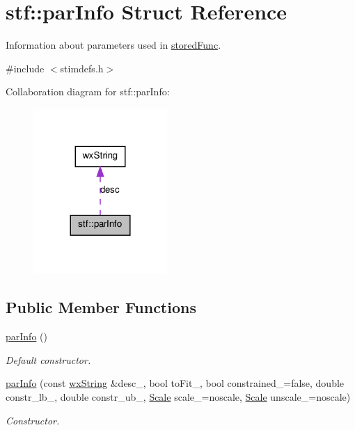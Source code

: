 \hypertarget{structstf_1_1parInfo}{
\section{stf::parInfo Struct Reference}
\label{structstf_1_1parInfo}
}


Information about parameters used in \hyperlink{structstf_1_1storedFunc}{storedFunc}.  




{\ttfamily \#include $<$stimdefs.h$>$}



Collaboration diagram for stf::parInfo:
\nopagebreak
\begin{figure}[H]
\begin{center}
\leavevmode
\includegraphics[width=144pt]{structstf_1_1parInfo__coll__graph}
\end{center}
\end{figure}
\subsection*{Public Member Functions}
\begin{DoxyCompactItemize}
\item 
\hypertarget{structstf_1_1parInfo_a785b7e816901e1a9d9a1d1081028e74d}{
\hyperlink{structstf_1_1parInfo_a785b7e816901e1a9d9a1d1081028e74d}{parInfo} ()}
\label{structstf_1_1parInfo_a785b7e816901e1a9d9a1d1081028e74d}

\begin{DoxyCompactList}\small\item\em Default constructor. \item\end{DoxyCompactList}\item 
\hyperlink{structstf_1_1parInfo_ac5abdf716cbc842663539219eafb2ca4}{parInfo} (const \hyperlink{classwxString}{wxString} \&desc\_\-, bool toFit\_\-, bool constrained\_\-=false, double constr\_\-lb\_, double constr\_\-ub\_, \hyperlink{group__stfgen_ga775530afebda38e8138e8eb1401a0e01}{Scale} scale\_\-=noscale, \hyperlink{group__stfgen_ga775530afebda38e8138e8eb1401a0e01}{Scale} unscale\_\-=noscale)
\begin{DoxyCompactList}\small\item\em Constructor. \item\end{DoxyCompactList}\end{DoxyCompactItemize}
